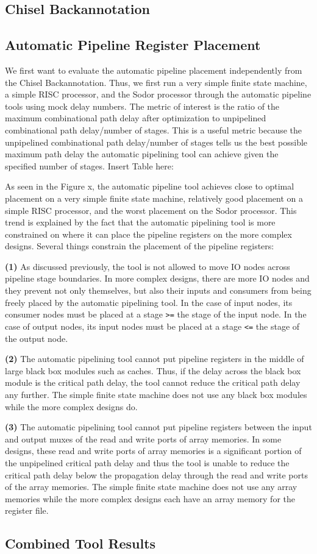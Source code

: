 \subsection{Chisel Backannotation}
\subsection{Automatic Pipeline Register Placement}
We first want to evaluate the automatic pipeline placement independently from the Chisel Backannotation. Thus, we first run a very simple finite state machine, a simple RISC processor, and the Sodor processor through the automatic pipeline tools using mock delay numbers.  The metric of interest is the ratio of the maximum combinational path delay after optimization to unpipelined combinational path delay/number of stages. This is a useful metric because the unpipelined combinational path delay/number of stages tells us the best possible maximum path delay the automatic pipelining tool can achieve given the specified number of stages. Insert Table here:

As seen in the Figure x, the automatic pipeline tool achieves close to optimal placement on a very simple finite state machine, relatively good placement on a simple RISC processor, and the worst placement on the Sodor processor. This trend is explained by the fact that the automatic pipelining tool is more constrained on where it can place the pipeline registers on the more complex designs. Several things constrain the placement of the pipeline registers:

{\bf (1)} 
As discussed previously, the tool is not allowed to move IO nodes across pipeline stage boundaries. In more complex designs, there are more IO nodes and they prevent not only themselves, but also their inputs and consumers from being freely placed by the automatic pipelining tool. In the case of input nodes, its consumer nodes must be placed at a stage {\tt >=} the stage of the input node. In the case of output nodes, its input nodes must be placed at a stage {\tt <=} the stage of the output node.

{\bf (2)}  
The automatic pipelining tool cannot put pipeline registers in the middle of large black box modules such as caches. Thus, if the delay across the black box module is the critical path delay, the tool cannot reduce the critical path delay any further. The simple finite state machine does not use any black box modules while the more complex designs do.

{\bf (3)} 
The automatic pipelining tool cannot put pipeline registers between the input and output muxes of the read and write ports of array memories. In some designs, these read and write ports of array memories is a significant portion of the unpipelined critical path delay and thus the tool is unable to reduce the critical path delay below the propagation delay through the read and write ports of the array memories. The simple finite state machine does not use any array memories while the more complex designs each have an array memory for the register file.
\subsection{Combined Tool Results}


